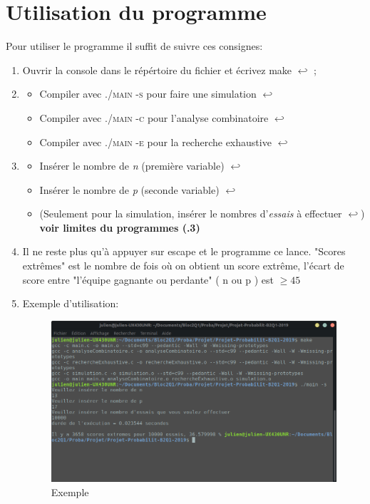 \documentclass[a4paper, 11pt, oneside]{article}
\begin{document}
	\section{Utilisation du programme}
	Pour utiliser le programme il suffit de suivre ces consignes:
	\begin{enumerate}

\item Ouvrir la console dans le répértoire du fichier et écrivez make $\hookleftarrow$ ;
\item \begin{itemize}[label=$\square$]
	\item Compiler avec \textsc{./main -s} pour faire une simulation $\hookleftarrow$
	\item Compiler avec \textsc{./main -c} pour l'analyse combinatoire $\hookleftarrow$
	\item Compiler avec \textsc{./main -e} pour la recherche exhaustive $\hookleftarrow$
\end{itemize}
\item \begin{itemize}[label=$\square$]

	\item Insérer le nombre de \textit{n} (première variable) $\hookleftarrow$
	\item Insérer le nombre de \textit{p} (seconde variable) $\hookleftarrow$
	\item (Seulement pour la simulation, insérer le nombres d'\textit{essais} à effectuer $\hookleftarrow$)\\

	\textbf{\color{BrickRed} \danger voir limites du programmes (.3)}
	\end{itemize}
	\item Il ne reste plus qu'à appuyer sur escape et le programme ce lance. "Scores extrêmes" est le nombre de fois où on obtient un score extrême, l'écart de score entre "l'équipe gagnante ou perdante" ( n ou p ) est $ \geq 45 $
\item Exemple d'utilisation: \\ \begin{figure}[!h]
			\centering
\includegraphics[scale=0.5]{exemple.png}
			\caption{Exemple}
		\end{figure}

\end{enumerate}
\end{document}
